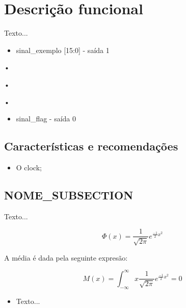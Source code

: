 \section{Descrição funcional} %
\label{sec:descricaofuncional}

Texto...

\begin{itemize}
    \item sinal\_exemplo [15:0] - saída 1

\end{itemize}    
     
\par \hspace{2cm}       • 
\par \hspace{2cm}       • 
\par \hspace{2cm}       • 
    
\begin{itemize}           
    \item sinal\_flag - saída 0
\end{itemize}


\subsection{Características e recomendações}

\begin{itemize}
  \item O clock;
\end{itemize}





\subsection{NOME\_SUBSECTION}

Texto...

$$ \Phi(x) = \frac{1}{\sqrt{2\pi}}e^{\frac{-1}{2}x^2} $$

\par A média é dada pela seguinte expresão:

$$ M(x) = \int_{-\infty}^{\infty} x \frac{1}{\sqrt{2\pi}}e^{\frac{-1}{2}x^2} = 0  $$


\begin{itemize}

  \item Texto...
  
\end{itemize}